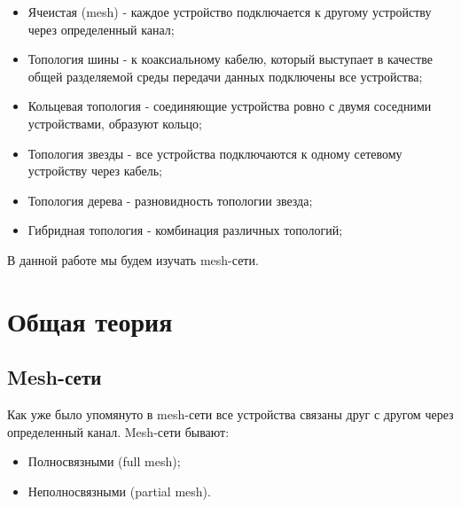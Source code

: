 \documentclass[a4paper]{article}
\begin{document}
\begin{itemize}
    \item Ячеистая (mesh) - каждое устройство подключается к другому устройству через определенный канал;
    \item Топология шины - к коаксиальному кабелю, который выступает в качестве общей разделяемой среды передачи данных подключены все устройства;
    \item Кольцевая топология - соединяющие устройства ровно с двумя соседними устройствами, образуют кольцо;
    \item Топология звезды - все устройства подключаются к одному сетевому устройству через кабель;
    \item Топология дерева - разновидность топологии звезда;
    \item Гибридная топология - комбинация различных топологий;
\end{itemize}
В данной работе мы будем изучать mesh-сети.
\section{Общая теория}

\subsection{Mesh-сети}
Как уже было упомянуто в mesh-сети все устройства связаны друг с другом через определенный канал.
Mesh-сети бывают: 
\begin{itemize}
    \item Полносвязными (full mesh);
    \item Неполносвязными (partial mesh).
\end{itemize}
\end{document}
